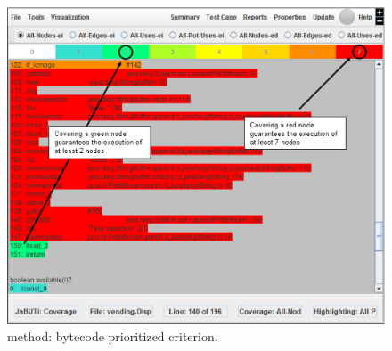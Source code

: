 
\begin{figure}[!ht]
\begin{center}
\includegraphics[height=0.40\textheight]{fig/dispenser-bytecode-edited.eps}
\caption{\label{fig:dispenser-bytecode} 
method: bytecode prioritized \wrt {} criterion.}
\end{center}
\end{figure}
